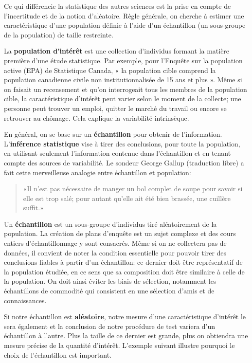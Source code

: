 \documentclass[
  11pt,
  letterpaper,
]{article}
\theoremstyle{definition}
\theoremstyle{definition}
\theoremstyle{definition}
\theoremstyle{definition}
\theoremstyle{remark}
\begin{document}
Ce qui différencie la statistique des autres sciences est la prise en compte de l'incertitude et de la notion d'aléatoire. Règle générale, on cherche à estimer une caractéristique d'une population définie à l'aide d'un échantillon (un sous-groupe de la population) de taille restreinte.

La \textbf{population d'intérêt} est une collection d'individus formant la matière première d'une étude statistique. Par exemple, pour l'Enquête sur la population active (EPA) de Statistique Canada, « la population cible comprend la population canadienne civile non institutionnalisée de 15 ans et plus ». Même si on faisait un recensement et qu'on interrogeait tous les membres de la population cible, la caractéristique d'intérêt peut varier selon le moment de la collecte; une personne peut trouver un emploi, quitter le marché du travail ou encore se retrouver au chômage. Cela explique la variabilité intrinsèque.

En général, on se base sur un \textbf{échantillon} pour obtenir de l'information. L'\textbf{inférence statistique} vise à tirer des conclusions, pour toute la population, en utilisant seulement l'information contenue dans l'échantillon et en tenant compte des sources de variabilité. Le sondeur George Gallup (traduction libre) a fait cette merveilleuse analogie entre échantillon et population:

\begin{quote}
«Il n'est pas nécessaire de manger un bol complet de soupe pour savoir si elle est trop salé; pour autant qu'elle ait été bien brassée, une cuillère suffit.»
\end{quote}

Un \textbf{échantillon} est un sous-groupe d'individus tiré aléatoirement de la population. La création de plans d'enquête est un sujet complexe et des cours entiers d'échantillonnage y sont consacrés. Même si on ne collectera pas de données, il convient de noter la condition essentielle pour pouvoir tirer des conclusions fiables à partir d'un échantillon: ce dernier doit être représentatif de la population étudiée, en ce sens que sa composition doit être similaire à celle de la population. On doit ainsi éviter les biais de sélection, notamment les échantillons de commodité qui consistent en une sélection d'amis et de connaissances.

Si notre échantillon est \textbf{aléatoire}, notre mesure d'une caractéristique d'intérêt le sera également et la conclusion de notre procédure de test variera d'un échantillon à l'autre. Plus la taille de ce dernier est grande, plus on obtiendra une mesure précise de la quantité d'intérêt. L'exemple suivant illustre pourquoi le choix de l'échantillon est important.
\end{document}

